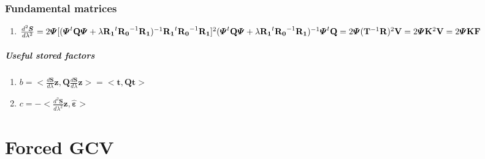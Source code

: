 \documentclass[11pt,twoside]{report}
\begin{document}
\subsection{Fundamental matrices}
\begin{enumerate}
	\item $\frac{d^2\mathbold{S}}{d\lambda^2} = 2 \boldsymbol{\Psi}[(\boldsymbol{\Psi}^t\mathbf{Q}\boldsymbol{\Psi}+\lambda\mathbf{R_1}^t\mathbf{R_0}^{-1}\mathbf{R_1})^{-1}\mathbf{R_1}^t\mathbf{R_0}^{-1}\mathbf{R_1}]^2(\boldsymbol{\Psi}^t\mathbf{Q}\boldsymbol{\Psi}+\lambda\mathbf{R_1}^t\mathbf{R_0}^{-1}\mathbf{R_1})^{-1}\boldsymbol{\Psi}^t\mathbf{Q}\\
	= 2\boldsymbol{\Psi}(\mathbf{T}^{-1}\mathbf{R})^2\mathbf{V} = 2\boldsymbol{\Psi}\mathbf{K}^2\mathbf{V} = 2\boldsymbol{\Psi}\mathbf{K}\mathbf{F}$
\end{enumerate}

\paragraph{Useful stored factors}
\begin{enumerate}
	\item $b = <\frac{d\mathbold{S}}{d\lambda}\mathbold{z},\mathbold{Q} \frac{d\mathbold{S}}{d\lambda}\mathbold{z}>  = <\mathbold{t},\mathbold{Q} \mathbold{t}>$
	\item $c = -<\frac{d^2\mathbold{S}}{d\lambda^2}\mathbold{z}, \hat{\mathbold{\varepsilon}}>$
\end{enumerate}

\chapter{Forced GCV}
\end{document}
